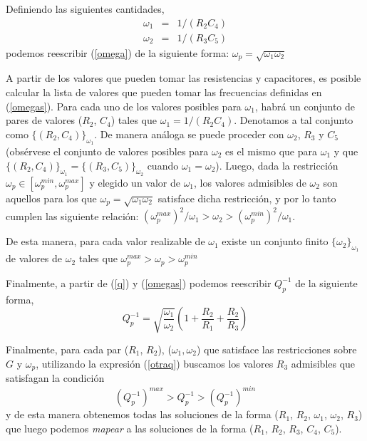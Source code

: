 \documentclass{llncs}
\begin{document}
    Definiendo las siguientes cantidades,
    \begin{eqnarray}
      \omega_1 &=& 1/(R_2 C_4) \nonumber \\
      \omega_2 &=& 1/(R_3 C_5)
      \label{omegas}
    \end{eqnarray}
    podemos reescribir (\ref{omega}) de la siguiente forma: $\omega_p = \sqrt{\omega_1  \omega_2}$

    
    A partir de los valores que pueden tomar las resistencias y capacitores, es
    posible calcular la lista de valores que pueden tomar las frecuencias
    definidas en (\ref{omegas}). Para cada uno de los valores posibles para
    $\omega_1$, habr\'a un conjunto de pares de valores ($R_2$, $C_4$) tales que
    $\omega_1 = 1/(R_2 C_4)$. Denotamos a tal conjunto como $\{(R_2,
      C_4)\}_{\omega_1}$. De manera an\'aloga se puede proceder con $\omega_2$,
      $R_3$ y $C_5$ (obs\'ervese el conjunto de valores posibles para $\omega_2$
      es el mismo que para $\omega_1$ y que $\{(R_2,C_4)\}_{\omega_1}=\{(R_3,
      C_5)\}_{\omega_2}$ cuando $\omega_1=\omega_2$). Luego, dada la restricci\'on $\omega_p \in 
    [\omega_p^{min},\omega_p^{max}]$ y elegido un valor de  $\omega_1$, los
    valores admisibles de $\omega_2$ son aquellos para los 
    que $\omega_p= \sqrt{\omega_1 \omega_2}$ satisface dicha restricci\'on, y
    por lo tanto cumplen las siguiente relaci\'on:
    $(\omega_p^{max})^2 / \omega_1 > \omega_2 > (\omega_p^{min})^2 / \omega_1 $.

    De esta manera, para cada valor realizable de $\omega_1$ existe un conjunto
    finito $\{{\omega_2}\}_{\omega_1}$ de valores de $\omega_2$ 
    tales que $ \omega_p^{max} > \omega_p > \omega_p^{min} $

    Finalmente, a partir de (\ref{q}) y (\ref{omegas}) podemos reescribir
    $Q_p^{-1}$ de la siguiente forma,
    \begin{equation}
    Q_p^{-1} =
    \sqrt{\frac{\omega_1}{\omega_2}}\left(1+\frac{R_2}{R_1}+\frac{R_2}{R_3}\right)
    \label{otraq}
    \end{equation}
    
    Finalmente, para cada par ($R_1$, $R_2$), ($\omega_1, \omega_2$) que satisface
    las restricciones sobre $G$ y $\omega_p$, utilizando la expresión
    (\ref{otraq}) buscamos
    los valores $R_3$ admisibles que satisfagan la 
    condici\'on
    $$
    (Q_p^{-1})^{max} > Q_p^{-1} > (Q_p^{-1})^{min}
    $$
    y de esta manera obtenemos todas las soluciones de la forma ($R_1$, $R_2$,
    $\omega_1$, $\omega_2$, $R_3$)  
    que luego podemos \textit{mapear} a las soluciones de la forma ($R_1$,
    $R_2$, $R_3$, $C_4$, $C_5$). 
\end{document}
